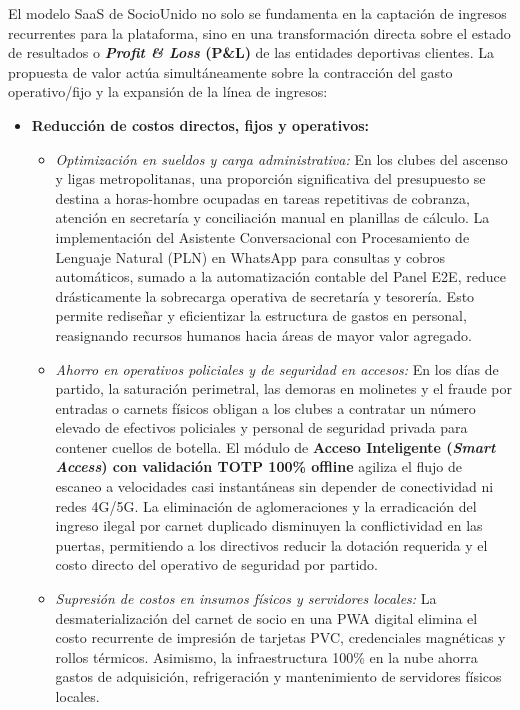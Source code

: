 El modelo SaaS de SocioUnido no solo se fundamenta en la captación de ingresos recurrentes para la plataforma, sino en una transformación directa sobre el estado de resultados o \textbf{\textit{Profit \& Loss} (P\&L)} de las entidades deportivas clientes. La propuesta de valor actúa simultáneamente sobre la contracción del gasto operativo/fijo y la expansión de la línea de ingresos:

\begin{itemize}
    \item \textbf{Reducción de costos directos, fijos y operativos:}
    \begin{itemize}
        \item \textit{Optimización en sueldos y carga administrativa:} En los clubes del ascenso y ligas metropolitanas, una proporción significativa del presupuesto se destina a horas-hombre ocupadas en tareas repetitivas de cobranza, atención en secretaría y conciliación manual en planillas de cálculo. La implementación del Asistente Conversacional con Procesamiento de Lenguaje Natural (PLN) en WhatsApp para consultas y cobros automáticos, sumado a la automatización contable del Panel E2E, reduce drásticamente la sobrecarga operativa de secretaría y tesorería. Esto permite rediseñar y eficientizar la estructura de gastos en personal, reasignando recursos humanos hacia áreas de mayor valor agregado.
        \item \textit{Ahorro en operativos policiales y de seguridad en accesos:} En los días de partido, la saturación perimetral, las demoras en molinetes y el fraude por entradas o carnets físicos obligan a los clubes a contratar un número elevado de efectivos policiales y personal de seguridad privada para contener cuellos de botella. El módulo de \textbf{Acceso Inteligente (\textit{Smart Access}) con validación TOTP 100\% offline} agiliza el flujo de escaneo a velocidades casi instantáneas sin depender de conectividad ni redes 4G/5G. La eliminación de aglomeraciones y la erradicación del ingreso ilegal por carnet duplicado disminuyen la conflictividad en las puertas, permitiendo a los directivos reducir la dotación requerida y el costo directo del operativo de seguridad por partido.
        \item \textit{Supresión de costos en insumos físicos y servidores locales:} La desmaterialización del carnet de socio en una PWA digital elimina el costo recurrente de impresión de tarjetas PVC, credenciales magnéticas y rollos térmicos. Asimismo, la infraestructura 100\% en la nube ahorra gastos de adquisición, refrigeración y mantenimiento de servidores físicos locales.
    \end{itemize}
    

\end{itemize}
